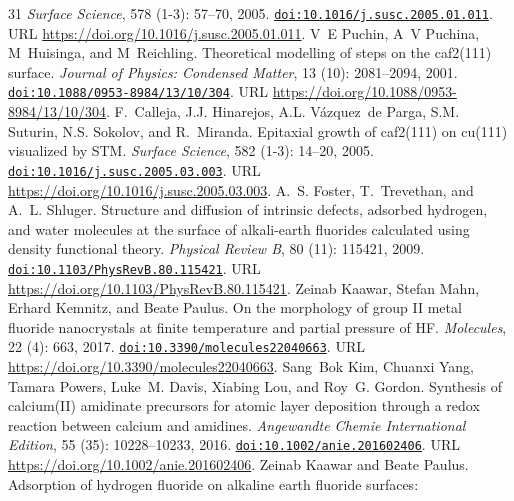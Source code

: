 \documentclass[11pt,a4paper]{article}
\theoremstyle{plain}
\theoremstyle{definition}
\theoremstyle{remark}
\providecommand{\doi}[1]{\href{https://doi.org/#1}{\texttt{doi:#1}}}
\begin{document}
\begin{thebibliography}{31}
\newblock \emph{Surface Science}, 578 (1-3): 57--70, 2005.
\newblock \doi{10.1016/j.susc.2005.01.011}.
\newblock URL \url{https://doi.org/10.1016/j.susc.2005.01.011}.
V~E Puchin, A~V Puchina, M~Huisinga, and M~Reichling.
\newblock Theoretical modelling of steps on the caf2(111) surface.
\newblock \emph{Journal of Physics: Condensed Matter}, 13
  (10): 2081--2094, 2001.
\newblock \doi{10.1088/0953-8984/13/10/304}.
\newblock URL \url{https://doi.org/10.1088/0953-8984/13/10/304}.
F.~Calleja, J.J. Hinarejos, A.L. Vázquez~de Parga, S.M. Suturin, N.S. Sokolov,
  and R.~Miranda.
\newblock Epitaxial growth of caf2(111) on cu(111) visualized by {STM}.
\newblock \emph{Surface Science}, 582 (1-3): 14--20, 2005.
\newblock \doi{10.1016/j.susc.2005.03.003}.
\newblock URL \url{https://doi.org/10.1016/j.susc.2005.03.003}.
A.~S. Foster, T.~Trevethan, and A.~L. Shluger.
\newblock Structure and diffusion of intrinsic defects, adsorbed hydrogen, and
  water molecules at the surface of alkali-earth fluorides calculated using
  density functional theory.
\newblock \emph{Physical Review B}, 80 (11): 115421, 2009.
\newblock \doi{10.1103/PhysRevB.80.115421}.
\newblock URL \url{https://doi.org/10.1103/PhysRevB.80.115421}.
Zeinab Kaawar, Stefan Mahn, Erhard Kemnitz, and Beate Paulus.
\newblock On the morphology of group {II} metal fluoride nanocrystals at finite
  temperature and partial pressure of {HF}.
\newblock \emph{Molecules}, 22 (4): 663, 2017.
\newblock \doi{10.3390/molecules22040663}.
\newblock URL \url{https://doi.org/10.3390/molecules22040663}.
Sang~Bok Kim, Chuanxi Yang, Tamara Powers, Luke~M. Davis, Xiabing Lou, and
  Roy~G. Gordon.
\newblock Synthesis of calcium({II}) amidinate precursors for atomic layer
  deposition through a redox reaction between calcium and amidines.
\newblock \emph{Angewandte Chemie International Edition}, 55
  (35): 10228--10233, 2016.
\newblock \doi{10.1002/anie.201602406}.
\newblock URL \url{https://doi.org/10.1002/anie.201602406}.
Zeinab Kaawar and Beate Paulus.
\newblock Adsorption of hydrogen fluoride on alkaline earth fluoride surfaces:

\end{thebibliography}
\end{document}
